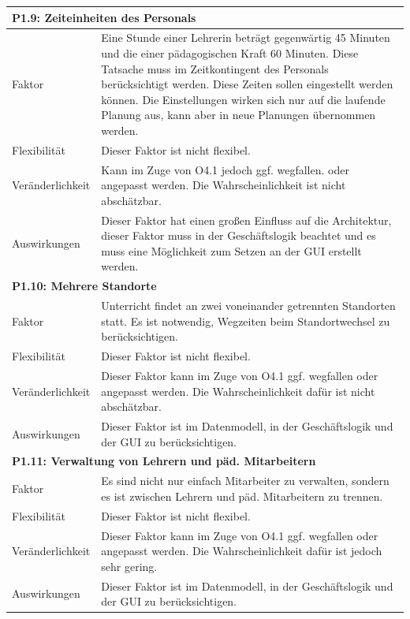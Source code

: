 \documentclass[fontsize=12pt,paper=a4,twoside]{scrartcl}
\begin{document}
\begin{tabularx}{\textwidth}{|l|X|}
\hline
\multicolumn{2}{|l|}{\textbf{P1.9: Zeiteinheiten des Personals}}\\\hline
Faktor & Eine Stunde einer Lehrerin beträgt gegenwärtig 45 Minuten und die einer pädagogischen Kraft 60 Minuten. Diese Tatsache muss im Zeitkontingent des Personals berücksichtigt werden. Diese Zeiten sollen eingestellt werden können. Die Einstellungen wirken sich nur auf die laufende Planung aus, kann aber in neue Planungen übernommen werden. \\\hline
Flexibilität & Dieser Faktor ist nicht flexibel. \\\hline
Veränderlichkeit & Kann im Zuge von O4.1 jedoch ggf. wegfallen. oder angepasst werden.  Die Wahrscheinlichkeit ist nicht abschätzbar. \\\hline
Auswirkungen & Dieser Faktor hat einen großen Einfluss auf die Architektur, dieser Faktor muss in der Geschäftslogik beachtet und es muss eine Möglichkeit zum Setzen an der GUI erstellt werden. \\\hline
\multicolumn{2}{|l|}{\textbf{P1.10: Mehrere Standorte}}\\\hline
Faktor & Unterricht findet an zwei voneinander getrennten Standorten statt. Es ist notwendig, Wegzeiten beim Standortwechsel zu berücksichtigen.\\\hline
Flexibilität & Dieser Faktor ist nicht flexibel.\\\hline
Veränderlichkeit & Dieser Faktor kann im Zuge von O4.1 ggf. wegfallen oder angepasst werden. Die Wahrscheinlichkeit dafür ist nicht abschätzbar.\\\hline
Auswirkungen & Dieser Faktor ist im Datenmodell, in der Geschäftslogik und der GUI zu berücksichtigen.\\\hline
\multicolumn{2}{|l|}{\textbf{P1.11: Verwaltung von Lehrern und päd. Mitarbeitern}}\\\hline
Faktor & Es sind nicht nur einfach Mitarbeiter zu verwalten, sondern es ist zwischen Lehrern und päd. Mitarbeitern zu trennen. \\\hline
Flexibilität & Dieser Faktor ist nicht flexibel.\\\hline
Veränderlichkeit & Dieser Faktor kann im Zuge von O4.1 ggf. wegfallen oder angepasst werden. Die Wahrscheinlichkeit dafür ist jedoch sehr gering.\\\hline
Auswirkungen & Dieser Faktor ist im Datenmodell, in der Geschäftslogik und der GUI zu berücksichtigen.\\\hline

\end{tabularx}
\end{document}
